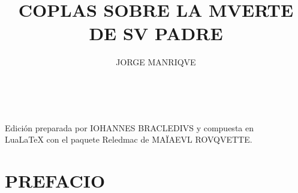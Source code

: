 \documentclass[11pt,a4paper,twoside]{article}
\title{COPLAS SOBRE LA MVERTE DE SV PADRE}
\author{\fontsize{14}{11.96}\selectfont JORGE MANRIQVE}
\date{\vspace{60pt}\fontsize{11}{11}\selectfont{EDICIÓN CRÍTICA LIMINAR}\\\fontsize{40}{11}\selectfont{\vfill\LaTeX}}
\begin{document}
	{
	\maketitle
}
	\newpage
%
\hskip0pt
\vfill
\begin{flushright}
	Edición preparada por {\fontsize{9}{1}\selectfont IOHANNES BRACLEDIVS} y compuesta en\\ LuaLaTeX con el paquete Reledmac de {\fontsize{9}{11}\selectfont MAÏAEVL ROVQVETTE}.
\end{flushright}
\newpage
%
\tableofcontents
\newpage
%
\setcounter{page}{1}
\section*{\centering\fontsize{11}{14}\selectfont PREFACIO}
\end{document}
